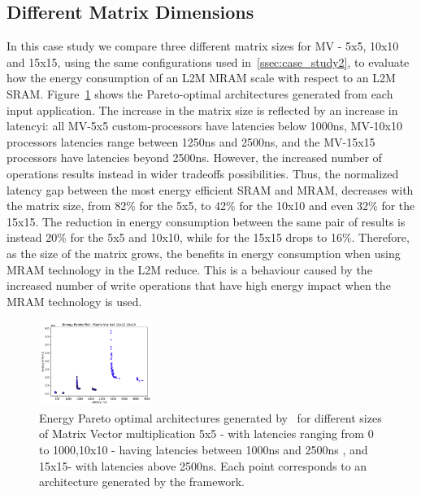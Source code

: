 \subsection{Different Matrix Dimensions}
In this case study we compare three different matrix sizes for MV - 5x5, 10x10 and 15x15, using the same configurations used in~\ref{ssec:case_study2}, to evaluate how the energy consumption of an L2M MRAM scale with respect to an L2M SRAM. Figure~\ref{fig:sram_vs_mram_pareto_vec_sizes} shows the Pareto-optimal architectures generated from each input application. The increase in the matrix size is reflected by an increase in latencyi: all MV-5x5 custom-processors have latencies below 1000ns, MV-10x10 processors latencies range between 1250ns and 2500ns, and the MV-15x15 processors have latencies beyond 2500ns.
However, the increased number of operations results instead in wider tradeoffs possibilities. Thus, the normalized latency gap between the most energy efficient SRAM and MRAM, decreases with the matrix size, from 82\% for the 5x5, to 42\% for the 10x10 and even 32\% for the 15x15. The reduction in energy consumption between the same pair of results is instead 20\% for the 5x5 and 10x10, while for the 15x15 drops to 16\%. Therefore, as the size of the matrix grows, the benefits in energy consumption when using MRAM technology in the L2M reduce. This is a behaviour caused by the increased number of write operations that have high energy impact when the MRAM technology is used.



\begin{figure}[!h]
\centering
\includegraphics[width=0.33\textwidth]{graphs/EnergyParetoPlotMultipleSizeMAtrixVec.pdf}
    \caption{\small Energy Pareto optimal architectures generated by \frameworkname ~for different sizes of Matrix Vector multiplication 5x5 - with latencies ranging from 0 to 1000,10x10 - having latencies between 1000ns and 2500ns , and 15x15- with latencies above 2500ns. Each point corresponds to an architecture generated by the framework.}
\label{fig:sram_vs_mram_pareto_vec_sizes}
\end{figure}
